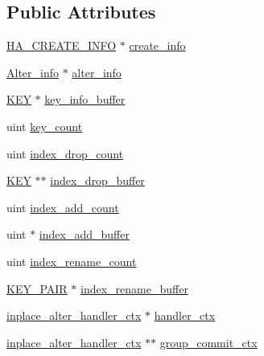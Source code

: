 \subsection*{Public Attributes}
\begin{DoxyCompactItemize}
\item 
\mbox{\hyperlink{structst__ha__create__information}{H\+A\+\_\+\+C\+R\+E\+A\+T\+E\+\_\+\+I\+N\+FO}} $\ast$ \mbox{\hyperlink{classAlter__inplace__info_a98ccd138fdc5742b611b7328fc1c77a4}{create\+\_\+info}}
\item 
\mbox{\hyperlink{classAlter__info}{Alter\+\_\+info}} $\ast$ \mbox{\hyperlink{classAlter__inplace__info_a025d7b7318cc152b91c63e89e9dbd2c8}{alter\+\_\+info}}
\item 
\mbox{\hyperlink{structst__key}{K\+EY}} $\ast$ \mbox{\hyperlink{classAlter__inplace__info_a1774915f106804ab1aeb6629d58bcae4}{key\+\_\+info\+\_\+buffer}}
\item 
uint \mbox{\hyperlink{classAlter__inplace__info_a06a73897d45e7a856647d308fae2bc95}{key\+\_\+count}}
\item 
uint \mbox{\hyperlink{classAlter__inplace__info_a41e2dc4598fb84412237f845b501d086}{index\+\_\+drop\+\_\+count}}
\item 
\mbox{\hyperlink{structst__key}{K\+EY}} $\ast$$\ast$ \mbox{\hyperlink{classAlter__inplace__info_ad4fe56b44525e8f3487d04d08ee9f7af}{index\+\_\+drop\+\_\+buffer}}
\item 
uint \mbox{\hyperlink{classAlter__inplace__info_a824b2d597ed6cfd9b7e45a01694e6561}{index\+\_\+add\+\_\+count}}
\item 
uint $\ast$ \mbox{\hyperlink{classAlter__inplace__info_adbd681149c93f943ff27833983ba1843}{index\+\_\+add\+\_\+buffer}}
\item 
uint \mbox{\hyperlink{classAlter__inplace__info_a9344a798cee362d987c0198d6a36a1fa}{index\+\_\+rename\+\_\+count}}
\item 
\mbox{\hyperlink{structKEY__PAIR}{K\+E\+Y\+\_\+\+P\+A\+IR}} $\ast$ \mbox{\hyperlink{classAlter__inplace__info_a647f50b8e6b500412aa5aa4f6b1e676b}{index\+\_\+rename\+\_\+buffer}}
\item 
\mbox{\hyperlink{classinplace__alter__handler__ctx}{inplace\+\_\+alter\+\_\+handler\+\_\+ctx}} $\ast$ \mbox{\hyperlink{classAlter__inplace__info_a840f4313301458d892e80fd5bb7c6bcd}{handler\+\_\+ctx}}
\item 
\mbox{\hyperlink{classinplace__alter__handler__ctx}{inplace\+\_\+alter\+\_\+handler\+\_\+ctx}} $\ast$$\ast$ \mbox{\hyperlink{classAlter__inplace__info_aeacdbdf2da7047907f86f6b78b4cda9e}{group\+\_\+commit\+\_\+ctx}}

\end{DoxyCompactItemize}

